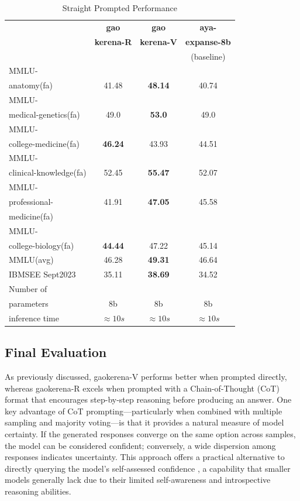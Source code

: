 \documentclass[conference]{IEEEtran}
\begin{document}
	\begin{table}[ht]
		\centering
		\caption{Straight Prompted Performance}
		\begin{tabular}{|l|c|c|c|}  
			\hline
			\textbf{} & \textbf{gao} & \textbf{gao} & \textbf{aya-} \\ 
			& \textbf{kerena-R} &  \textbf{kerena-V} & \textbf{expanse-8b} \\
			&   & &(baseline)  \\ \hline
			MMLU- &  &  &  \\ 
			anatomy(fa)  & 41.48 & \textbf{48.14}  & 40.74  \\ \hline
			MMLU- &    &   &   \\
			medical-genetics(fa) & 49.0  & \textbf{53.0}  &  49.0 \\ \hline
			MMLU- &  &    &  \\
			college-medicine(fa) & \textbf{46.24} & 43.93  & 44.51   \\ \hline
			MMLU- &    &  &  \\
			clinical-knowledge(fa) & 52.45 & \textbf{55.47}  & 52.07  \\ \hline
			MMLU- &  &  &  \\
			professional-& 41.91  & \textbf{47.05}  & 45.58   \\
                        medicine(fa)& &   &   \\ \hline
			MMLU- &  &  &  \\
			college-biology(fa)& \textbf{44.44} & 47.22  &  45.14 \\ \hline
			MMLU(avg) & 46.28 & \textbf{49.31}  & 46.64 \\ \hline
			IBMSEE Sept2023 & 35.11  &\textbf{38.69} & 34.52  \\ \hline
			Number of&  &  &  \\
			parameters & 8b & 8b & 8b \\ \hline
			inference time & $\approx10s$ & $\approx 10s$ & $\approx 10s$ \\  \hline
		\end{tabular}
		\label{tab:med_knowledge_comparison}
	\end{table}


           \subsection{Final Evaluation}
As previously discussed, gaokerena-V performs better when prompted directly, whereas gaokerena-R excels when prompted with a Chain-of-Thought (CoT) format that encourages step-by-step reasoning before producing an answer. One key advantage of CoT prompting—particularly when combined with multiple sampling and majority voting—is that it provides a natural measure of model certainty. If the generated responses converge on the same option across samples, the model can be considered confident; conversely, a wide dispersion among responses indicates uncertainty. This approach offers a practical alternative to directly querying the model’s self-assessed confidence
\cite{b21}
, a capability that smaller models generally lack due to their limited self-awareness and introspective reasoning abilities.
\end{document}
